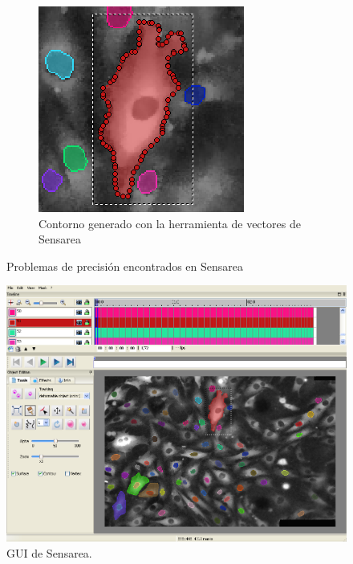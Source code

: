 \begin{figure}
\begin{subfigure}[b]{0.3\textwidth}
		\includegraphics[width=\textwidth]{images/sens2}
		\caption{Contorno generado con la herramienta de vectores de Sensarea}
		\label{fig:sens2}
	\end{subfigure}
	\caption{Problemas de precisión encontrados en Sensarea}\label{fig:sensareaP}
\end{figure}

\begin{figure}
	\includegraphics[width=1\linewidth]{images/sens3}
	\caption{GUI de Sensarea.} \label{fig:sensareaGUI}
\end{figure}



